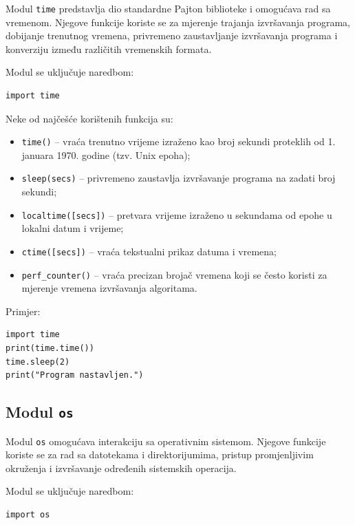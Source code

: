 Modul \texttt{time} predstavlja dio standardne Pajton biblioteke i omogućava rad sa vremenom. Njegove funkcije koriste se za mjerenje trajanja izvršavanja programa, dobijanje trenutnog vremena, privremeno zaustavljanje izvršavanja programa i konverziju između različitih vremenskih formata.

Modul se uključuje naredbom:
\begin{verbatim}
import time
\end{verbatim}

Neke od najčešće korištenih funkcija su:

\begin{itemize}
	\item \texttt{time()} -- vraća trenutno vrijeme izraženo kao broj sekundi proteklih od 1. januara 1970. godine (tzv. Unix epoha);
	
	\item \texttt{sleep(secs)} -- privremeno zaustavlja izvršavanje programa na zadati broj sekundi;
	
	\item \texttt{localtime([secs])} -- pretvara vrijeme izraženo u sekundama od epohe u lokalni datum i vrijeme;
	
	\item \texttt{ctime([secs])} -- vraća tekstualni prikaz datuma i vremena;
	
	\item \texttt{perf\_counter()} -- vraća precizan brojač vremena koji se često koristi za mjerenje vremena izvršavanja algoritama.
	
\end{itemize}

Primjer:

\begin{verbatim}
import time
print(time.time())
time.sleep(2)
print("Program nastavljen.")
\end{verbatim}

\subsection{Modul \texttt{os}}

Modul \texttt{os} omogućava interakciju sa operativnim sistemom. Njegove funkcije koriste se za rad sa datotekama i direktorijumima, pristup promjenljivim okruženja i izvršavanje određenih sistemskih operacija.

Modul se uključuje naredbom:

\begin{verbatim}
import os
\end{verbatim}

